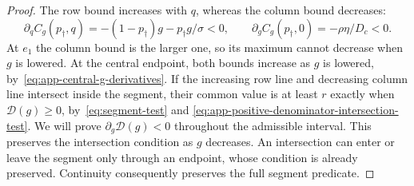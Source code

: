 \documentclass[11pt]{article}
\theoremstyle{remark}
\theoremstyle{plain}
\begin{document}
\begin{proof}
The row bound increases with $q$, whereas the column bound decreases:
\begin{equation}
 \partial_qC_g(p_\dagger,q)
        =-(1-p_\dagger)g-p_\dagger g/\sigma<0,\qquad
 \partial_gC_g(p_\dagger,0)=-\rho\eta/D_c<0.
 \label{eq:app-lower-segment-column-derivatives}
\end{equation}
At $e_1$ the column bound is the larger one, so its maximum
cannot decrease when $g$ is lowered. At the central endpoint, both
bounds increase as $g$ is lowered,
by~\eqref{eq:app-central-g-derivatives}.
If the increasing row line and decreasing column line intersect
inside the segment, their common value is at least $r$ exactly
when $\mathcal D(g)\ge0$, by~\eqref{eq:segment-test} and
\eqref{eq:app-positive-denominator-intersection-test}.
We will prove $\partial_g\mathcal D(g)<0$ throughout the admissible
interval. This preserves the intersection condition as $g$ decreases.
An intersection can enter or leave the segment only through an
endpoint, whose condition is already preserved. Continuity consequently
preserves the full segment predicate.


\end{proof}
\end{document}

